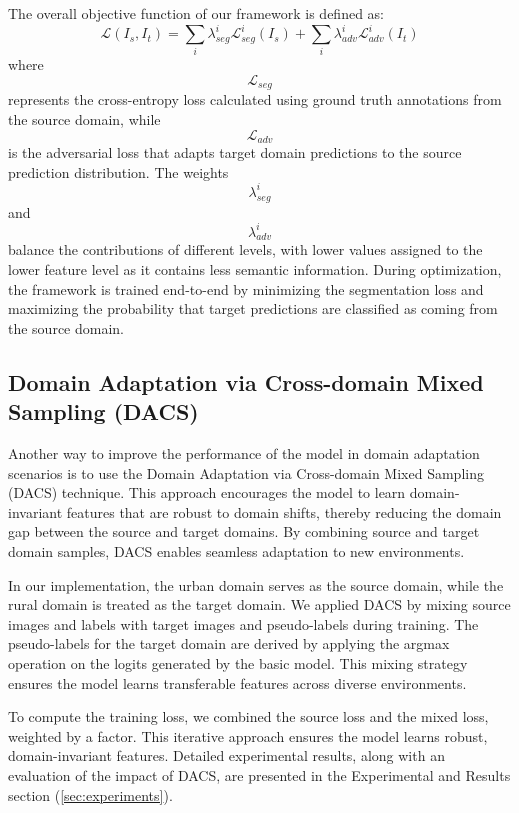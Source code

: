 \documentclass[10pt,twocolumn,letterpaper]{article}
\begin{document}
The overall objective function of our framework is defined as:
$$\mathcal{L}(I_s, I_t) = \sum_i \lambda_{seg}^i \mathcal{L}_{seg}^i(I_s) + \sum_i \lambda_{adv}^i \mathcal{L}_{adv}^i(I_t)$$
where $$\mathcal{L}_{seg}$$ represents the cross-entropy loss calculated using ground truth annotations from the source domain, while $$\mathcal{L}_{adv}$$ is the adversarial loss that adapts target domain predictions to the source prediction distribution. The weights $$\lambda_{seg}^i$$ and $$\lambda_{adv}^i$$ balance the contributions of different levels, with lower values assigned to the lower feature level as it contains less semantic information. During optimization, the framework is trained end-to-end by minimizing the segmentation loss and maximizing the probability that target predictions are classified as coming from the source domain.

\subsection{Domain Adaptation via Cross-domain Mixed Sampling (DACS)}

Another way to improve the performance of the model in domain adaptation scenarios is to use the Domain Adaptation via Cross-domain Mixed Sampling (DACS) technique. This approach encourages the model to learn domain-invariant features that are robust to domain shifts, thereby reducing the domain gap between the source and target domains. By combining source and target domain samples, DACS enables seamless adaptation to new environments.

In our implementation, the urban domain serves as the source domain, while the rural domain is treated as the target domain. We applied DACS by mixing source images and labels with target images and pseudo-labels during training. The pseudo-labels for the target domain are derived by applying the argmax operation on the logits generated by the basic model. This mixing strategy ensures the model learns transferable features across diverse environments.

To compute the training loss, we combined the source loss and the mixed loss, weighted by a factor. This iterative approach ensures the model learns robust, domain-invariant features. Detailed experimental results, along with an evaluation of the impact of DACS, are presented in the Experimental and Results section (\ref{sec:experiments}).
\end{document}
